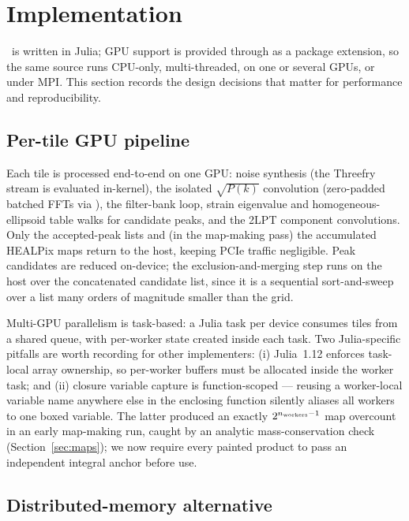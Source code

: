 \section{Implementation}
\label{sec:implementation}

\ppjl\ is written in Julia; GPU support is provided through 
\citep{Besard2018} as a package extension, so the same source runs CPU-only,
multi-threaded, on one or several GPUs, or under MPI. This section records the
design decisions that matter for performance and reproducibility.

\subsection{Per-tile GPU pipeline}
\label{sec:impl-gpu}

Each tile is processed end-to-end on one GPU: noise synthesis (the Threefry
stream is evaluated in-kernel), the isolated $\sqrt{P(k)}$ convolution
(zero-padded batched FFTs via ), the filter-bank loop, strain
eigenvalue and homogeneous-ellipsoid table walks for candidate peaks, and the
2LPT component convolutions. Only the accepted-peak lists and (in the
map-making pass) the accumulated HEALPix maps return to the host, keeping
PCIe traffic negligible. Peak candidates are reduced on-device; the
exclusion-and-merging step runs on the host over the concatenated candidate
list, since it is a sequential sort-and-sweep over a list many orders of
magnitude smaller than the grid.

Multi-GPU parallelism is task-based: a Julia task per device consumes tiles
from a shared queue, with per-worker state created inside each task. Two
Julia-specific pitfalls are worth recording for other implementers: (i)
Julia~1.12 enforces task-local array ownership, so per-worker buffers must be
allocated inside the worker task; and (ii) closure variable capture is
function-scoped --- reusing a worker-local variable name anywhere else in the
enclosing function silently aliases all workers to one boxed variable. The
latter produced an exactly $2^{n_{\rm workers}-1}$ map overcount in an early
map-making run, caught by an analytic mass-conservation check
(Section~\ref{sec:maps}); we now require every painted product to pass an
independent integral anchor before use.

\subsection{Distributed-memory alternative}
\label{sec:impl-mpi}

